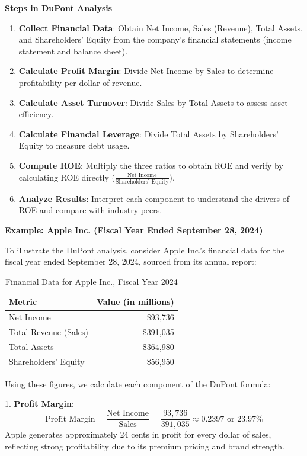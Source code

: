 \documentclass[12pt]{article}
\begin{document}
\textbf{Steps in DuPont Analysis}

\begin{enumerate}
    \item \textbf{Collect Financial Data}: Obtain Net Income, Sales (Revenue), Total Assets, and Shareholders' Equity from the company's financial statements (income statement and balance sheet).
    \item \textbf{Calculate Profit Margin}: Divide Net Income by Sales to determine profitability per dollar of revenue.
    \item \textbf{Calculate Asset Turnover}: Divide Sales by Total Assets to assess asset efficiency.
    \item \textbf{Calculate Financial Leverage}: Divide Total Assets by Shareholders' Equity to measure debt usage.
    \item \textbf{Compute ROE}: Multiply the three ratios to obtain ROE and verify by calculating ROE directly (\(\frac{\text{Net Income}}{\text{Shareholders' Equity}}\)).
    \item \textbf{Analyze Results}: Interpret each component to understand the drivers of ROE and compare with industry peers.
\end{enumerate}

\textbf{Example: Apple Inc. (Fiscal Year Ended September 28, 2024)}

To illustrate the DuPont analysis, consider Apple Inc.'s financial data for the fiscal year ended September 28, 2024, sourced from its annual report:

\begin{table}[h]
\centering
\begin{tabular}{|l|r|}
\hline
\textbf{Metric} & \textbf{Value (in millions)} \\
\hline
Net Income & \$93,736 \\
Total Revenue (Sales) & \$391,035 \\
Total Assets & \$364,980 \\
Shareholders' Equity & \$56,950 \\
\hline
\end{tabular}
\caption{Financial Data for Apple Inc., Fiscal Year 2024}
\end{table}

Using these figures, we calculate each component of the DuPont formula:

1. \textbf{Profit Margin}:
   \[
   \text{Profit Margin} = \frac{\text{Net Income}}{\text{Sales}} = \frac{93,736}{391,035} \approx 0.2397 \text{ or } 23.97\%
   \]
   Apple generates approximately 24 cents in profit for every dollar of sales, reflecting strong profitability due to its premium pricing and brand strength.
\end{document}
